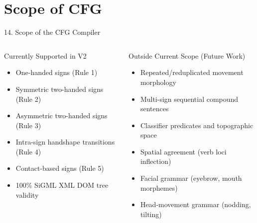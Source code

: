 \documentclass[aspectratio=169,xcolor={table,dvipsnames}]{beamer}
\begin{document}
\section{Scope of CFG}
\begin{frame}{14. Scope of the CFG Compiler}
    \small
    \vspace{2mm}
    
    \begin{columns}[T]
        \begin{block}{Currently Supported in V2}
            \begin{itemize}
                \item[\textcolor{green!60!black}{$\checkmark$}] One-handed signs (Rule 1)
                \item[\textcolor{green!60!black}{$\checkmark$}] Symmetric two-handed signs (Rule 2)
                \item[\textcolor{green!60!black}{$\checkmark$}] Asymmetric two-handed signs (Rule 3)
                \item[\textcolor{green!60!black}{$\checkmark$}] Intra-sign handshape transitions (Rule 4)
                \item[\textcolor{green!60!black}{$\checkmark$}] Contact-based signs (Rule 5)
                \item[\textcolor{green!60!black}{$\checkmark$}] 100\% SiGML XML DOM tree validity
            \end{itemize}
        \end{block}
        
        \begin{block}{Outside Current Scope (Future Work)}
            \begin{itemize}
                \item[\textcolor{red}{$\times$}] Repeated/reduplicated movement morphology
                \item[\textcolor{red}{$\times$}] Multi-sign sequential compound sentences
                \item[\textcolor{red}{$\times$}] Classifier predicates and topographic space
                \item[\textcolor{red}{$\times$}] Spatial agreement (verb loci inflection)
                \item[\textcolor{red}{$\times$}] Facial grammar (eyebrow, mouth morphemes)
                \item[\textcolor{red}{$\times$}] Head-movement grammar (nodding, tilting)
            \end{itemize}
        \end{block}
    \end{columns}
    
    \vspace{6mm}
\end{frame}
\end{document}
